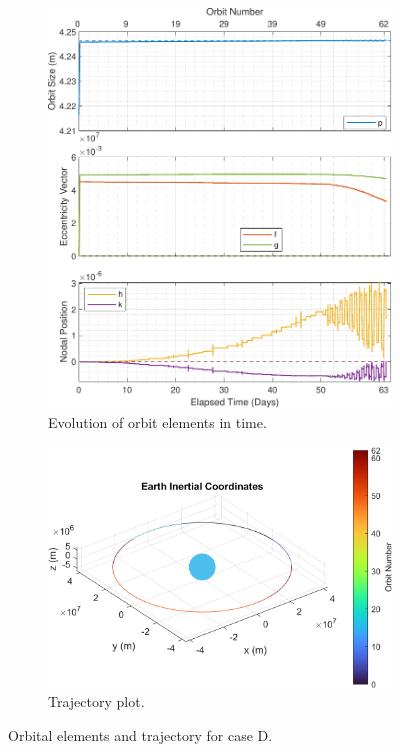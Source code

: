 \begin{figure}[H]
    \centering
    \begin{subfigure}[t]{0.4\textwidth}
        \includegraphics[width=\textwidth]{figures/geo_disposal/orbital_elements.pdf}
        \caption{Evolution of orbit elements in time.}
        \label{fig:results_results_c_a}
    \end{subfigure}
    \begin{subfigure}[t]{0.59\textwidth}
        \includegraphics[width=\textwidth]{figures/geo_disposal/trajectory_plot.png}
        \caption{Trajectory plot.}
        \label{fig:results_results_c_b}
    \end{subfigure}
    \caption{Orbital elements and trajectory for case D.}
    \label{fig:results_results_c}
\end{figure}

